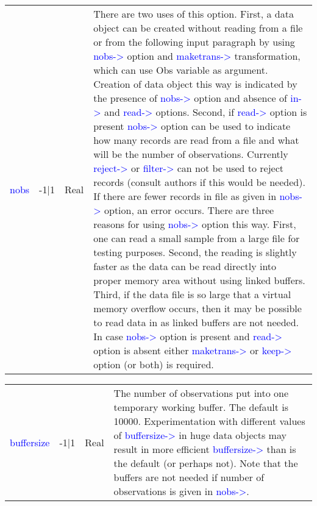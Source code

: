 \begin{table}[H]
\begin{tabular}{ m{}  m{}m{}p{}}
 \textcolor{blue}{nobs}&-1|1&Real& There are two uses of this option. First, a data object can be created without reading
 from a file or from the following input paragraph by using \textcolor{blue}{nobs->} option and
 \textcolor{blue}{maketrans->} transformation, which can use Obs variable as argument. Creation
 of data object this way is indicated by the presence of \textcolor{blue}{nobs->} option and absence
 of \textcolor{blue}{in->} and \textcolor{blue}{read->} options. Second, if \textcolor{blue}{read->} option is present \textcolor{blue}{nobs->}
 option can be used to indicate how many records are read from a file and what
 will be the number of observations. Currently \textcolor{blue}{reject->} or \textcolor{blue}{filter->} can not
 be used to reject records (consult authors if this would be needed). If there are
 fewer records in file as given in \textcolor{blue}{nobs->} option, an error occurs. There are three
 reasons for using \textcolor{blue}{nobs->} option this way. First, one can read a small sample
 from a large file for testing purposes. Second, the reading is slightly faster as the
 data can be read directly into proper memory area without using linked buffers.
 Third, if the data file is so large that a virtual memory overflow occurs, then it may
 be possible to read data in as linked buffers are not needed.
 In case \textcolor{blue}{nobs->} option is present and \textcolor{blue}{read->} option is absent either
 \textcolor{blue}{maketrans->} or \textcolor{blue}{keep->} option (or both) is required.
\\ \cline{1-4}
\end{tabular}
\end{table}
\vspace{-1.51em}
\begin{table}[H]
\begin{tabular}{ m{}  m{}m{}p{}}
 \textcolor{blue}{buffersize}&-1|1&Real&
 The number of observations put into one temporary working buffer. The default
 is 10000. Experimentation with different values of \textcolor{blue}{buffersize->} in huge data
 objects may result in more efficient \textcolor{blue}{buffersize->} than is the default (or perhaps
 not). Note that the buffers are not needed if number of observations is given in
 \textcolor{blue}{nobs->}.

\\ \cline{1-4}
\end{tabular}
\end{table}
